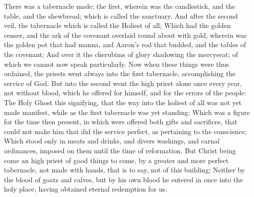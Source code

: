  There was a tabernacle made; the first, wherein was the candlestick, and the table, and the shewbread; which is called the sanctuary. And after the second veil, the tabernacle which is called the Holiest of all; Which had the golden censer, and the ark of the covenant overlaid round about with gold, wherein was the golden pot that had manna, and Aaron's rod that budded, and the tables of the covenant; And over it the cherubims of glory shadowing the mercyseat; of which we cannot now speak particularly. Now when these things were thus ordained, the priests went always into the first tabernacle, accomplishing the service of God. But into the second went the high priest alone once every year, not without blood, which he offered for himself, and for the errors of the people: The Holy Ghost this signifying, that the way into the holiest of all was not yet made manifest, while as the first tabernacle was yet standing: Which was a figure for the time then present, in which were offered both gifts and sacrifices, that could not make him that did the service perfect, as pertaining to the conscience; Which stood only in meats and drinks, and divers washings, and carnal ordinances, imposed on them until the time of reformation. But Christ being come an high priest of good things to come, by a greater and more perfect tabernacle, not made with hands, that is to say, not of this building; Neither by the blood of goats and calves, but by his own blood he entered in once into the holy place, having obtained eternal redemption for us.
